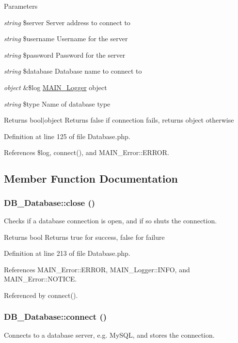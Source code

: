 \begin{DoxyParams}{Parameters}
\item[{\em string}]\$server Server address to connect to \item[{\em string}]\$username Username for the server \item[{\em string}]\$password Password for the server \item[{\em string}]\$database Database name to connect to \item[{\em object}]\&\$log \hyperlink{classMAIN__Logger}{MAIN\_\-Logger} object \item[{\em string}]\$type Name of database type\end{DoxyParams}
\begin{DoxyReturn}{Returns}
bool$|$object Returns false if connection fails, returns object otherwise 
\end{DoxyReturn}


Definition at line 125 of file Database.php.

References \$log, connect(), and MAIN\_\-Error::ERROR.

\subsection{Member Function Documentation}
\hypertarget{classDB__Database_ad8f40ab058e072bc074a9447eb8a7762}{
\subsubsection[{close}]{\setlength{\rightskip}{0pt plus 5cm}DB\_\-Database::close ()}}
\label{d3/d63/classDB__Database_ad8f40ab058e072bc074a9447eb8a7762}
Checks if a database connection is open, and if so shuts the connection.

\begin{DoxyReturn}{Returns}
bool Returns true for success, false for failure 
\end{DoxyReturn}


Definition at line 213 of file Database.php.

References MAIN\_\-Error::ERROR, MAIN\_\-Logger::INFO, and MAIN\_\-Error::NOTICE.

Referenced by connect().\hypertarget{classDB__Database_a3312e7903885b871d21a18efbe558580}{
\subsubsection[{connect}]{\setlength{\rightskip}{0pt plus 5cm}DB\_\-Database::connect ()}}
\label{d3/d63/classDB__Database_a3312e7903885b871d21a18efbe558580}
Connects to a database server, e.g. MySQL, and stores the connection.

